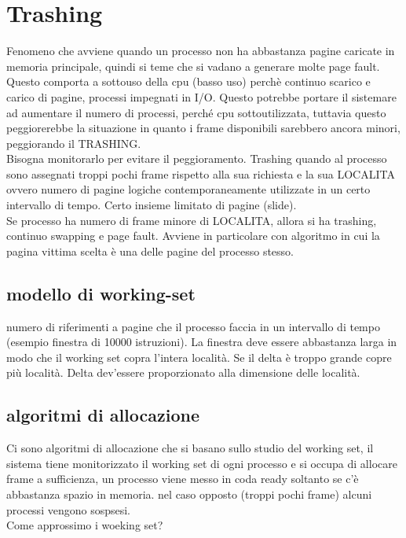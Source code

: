 \documentclass{article}
\begin{document}
\section{Trashing}
Fenomeno che avviene quando un processo non ha abbastanza pagine caricate in memoria principale, quindi si teme 
che si vadano a generare molte page fault. Questo comporta a sottouso della cpu (basso uso) perchè continuo scarico e carico di pagine, 
processi impegnati in I/O. Questo potrebbe portare il sistemare ad aumentare il numero di processi, perché cpu sottoutilizzata, 
tuttavia questo peggiorerebbe la situazione in quanto i frame disponibili sarebbero ancora minori, peggiorando il TRASHING.\\
Bisogna monitorarlo per evitare il peggioramento. Trashing quando al processo sono assegnati troppi pochi frame rispetto alla sua richiesta 
e la sua LOCALITA ovvero numero di pagine logiche contemporaneamente utilizzate in un certo intervallo di tempo. Certo insieme limitato di pagine (slide).\\
Se processo ha numero di frame minore di LOCALITA, allora si ha trashing, continuo swapping e page fault. Avviene in particolare con algoritmo in cui la pagina 
vittima scelta è una delle pagine del processo stesso.\\ 
\subsection{modello di working-set}
numero di riferimenti a pagine che il processo faccia in un intervallo di tempo (esempio finestra di 10000 istruzioni). 
La finestra deve essere abbastanza larga in modo che il working set copra l'intera località. Se il delta è troppo grande 
copre più località. Delta dev'essere proporzionato alla dimensione delle località.\\
\subsection{algoritmi di allocazione}
Ci sono algoritmi di allocazione che si basano sullo studio del working set, il sistema tiene monitorizzato il working set di ogni processo e 
si occupa di allocare frame a sufficienza, un processo viene messo in coda ready soltanto se c'è abbastanza spazio in memoria. nel caso opposto 
(troppi pochi frame) alcuni processi vengono sospsesi.\\
Come approssimo i woeking set?\\ 
\end{document}
